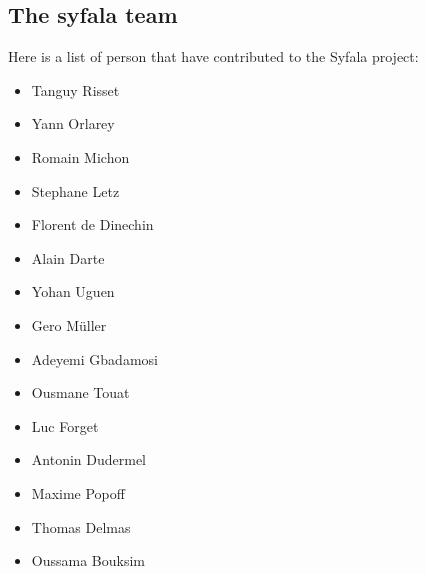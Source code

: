 \subsection{The syfala team}
Here is a list of person that have contributed to the Syfala project:
\begin{itemize}
\item Tanguy Risset
\item Yann Orlarey
\item Romain Michon
\item Stephane Letz
\item Florent de Dinechin
\item Alain Darte
\item Yohan Uguen
\item Gero Müller
\item Adeyemi Gbadamosi
\item Ousmane Touat
\item Luc Forget
\item Antonin Dudermel
\item Maxime Popoff
\item Thomas Delmas
\item Oussama Bouksim
\end{itemize}

